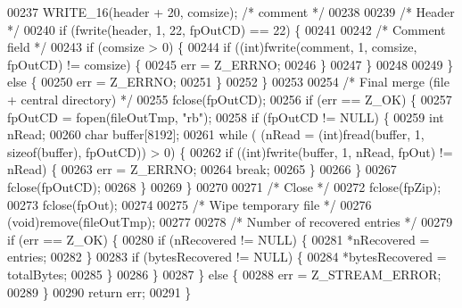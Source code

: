 \begin{DoxyCode}
00237       WRITE\_16(header + 20, comsize);     \textcolor{comment}{/* comment */}
00238 
00239       \textcolor{comment}{/* Header */}
00240       \textcolor{keywordflow}{if} (fwrite(header, 1, 22, fpOutCD) == 22) \{
00241 
00242         \textcolor{comment}{/* Comment field */}
00243         \textcolor{keywordflow}{if} (comsize > 0) \{
00244           \textcolor{keywordflow}{if} ((\textcolor{keywordtype}{int})fwrite(comment, 1, comsize, fpOutCD) != comsize) \{
00245             err = Z\_ERRNO;
00246           \}
00247         \}
00248 
00249       \} \textcolor{keywordflow}{else} \{
00250         err = Z\_ERRNO;
00251       \}
00252     \}
00253 
00254     \textcolor{comment}{/* Final merge (file + central directory) */}
00255     fclose(fpOutCD);
00256     \textcolor{keywordflow}{if} (err == Z\_OK) \{
00257       fpOutCD = fopen(fileOutTmp, \textcolor{stringliteral}{"rb"});
00258       \textcolor{keywordflow}{if} (fpOutCD != NULL) \{
00259         \textcolor{keywordtype}{int} nRead;
00260         \textcolor{keywordtype}{char} buffer[8192];
00261         \textcolor{keywordflow}{while} ( (nRead = (\textcolor{keywordtype}{int})fread(buffer, 1, \textcolor{keyword}{sizeof}(buffer), fpOutCD)) > 0) \{
00262           \textcolor{keywordflow}{if} ((\textcolor{keywordtype}{int})fwrite(buffer, 1, nRead, fpOut) != nRead) \{
00263             err = Z\_ERRNO;
00264             \textcolor{keywordflow}{break};
00265           \}
00266         \}
00267         fclose(fpOutCD);
00268       \}
00269     \}
00270 
00271     \textcolor{comment}{/* Close */}
00272     fclose(fpZip);
00273     fclose(fpOut);
00274 
00275     \textcolor{comment}{/* Wipe temporary file */}
00276     (void)\textcolor{keyword}{remove}(fileOutTmp);
00277 
00278     \textcolor{comment}{/* Number of recovered entries */}
00279     \textcolor{keywordflow}{if} (err == Z\_OK) \{
00280       \textcolor{keywordflow}{if} (nRecovered != NULL) \{
00281         *nRecovered = entries;
00282       \}
00283       \textcolor{keywordflow}{if} (bytesRecovered != NULL) \{
00284         *bytesRecovered = totalBytes;
00285       \}
00286     \}
00287   \} \textcolor{keywordflow}{else} \{
00288     err = Z\_STREAM\_ERROR;
00289   \}
00290   \textcolor{keywordflow}{return} err;
00291 \}
\end{DoxyCode}
